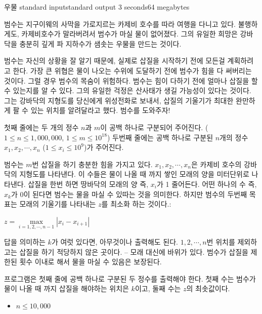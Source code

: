 \begin{problem}{우물}
	{standard input}{standard output}
	{3 seconds}{64 megabytes}{}
	
	
	범수는 지구이웨의 사막을 가로지르는 카제비 호수를 따라 여행을 다니고 있다. 불행하게도, 카제비호수가 말라버려서 범수가 마실 물이 없어졌다. 그의 유일한 희망은 강바닥을 충분히 깊게 파 지하수가 샘솟는 우물을 만드는 것이다.

	범수는 자신의 상황을 잘 알기 때문에, 실제로 삽질을 시작하기 전에 모든걸 계획하려고 한다. 가장 큰 위협은 물이 나오는 수위에 도달하기 전에 범수가 힘을 다 써버리는 것이다. 그럴 경우 범수의 목숨이 위험하다. 범수는 힘이 다하기 전에 얼마나 삽질을 할 수 있는지를 알 수 있다. 그의 유일한 걱정은 산사태가 생길 가능성이 있다는 것이다. 그는 강바닥의 지형도를 당신에게 위성전화로 보내서, 삽질의 기울기가 최대한 완만하게 팔 수 있는 위치를 알려달라고 했다. 범수를 도와주자!
 
	\InputFile
	
	 첫째 줄에는 두 개의 정수 $n$과 $m$이 공백 하나로 구분되어 주어진다. ($1 \le n \le 1,000,000$, $1 \le m \le 10^{18}$) 두번째 줄에는 공백 하나로 구분된 $n$개의 정수 $x_1 , x_2 , \cdots, x_n$ ($1 \le x_i \le 10^9$)가 주어진다.
	 
	 범수는 $m$번 삽질을 하기 충분한 힘을 가지고 있다. $x_1, x_2, \cdots, x_n$은 카제비 호수의 강바닥의 지형도를 나타낸다. 이 수들은 물이 나올 때 까지 쌓인 모래의 양을 미터단위로 나타낸다. 삽질을 한번 하면 땅바닥의 모래의 양 즉, $x_i$가 1 줄어든다. 어떤 하나의 수 즉, $x_k$가 0이 된다면 범수는 물을 마실 수 있따는 것을 의미한다. 하지만 범수의 두번째 목표는 모래의 기울기를 나타내는 $z$를 최소화 하는 것이다.:

\begin{center}
	\Large
	$z =  \underset{i=1, 2, \cdots, n-1}{\max} |x_i - x_{i+1}|$
\end{center}

	답을 의미하는 $k$가 여럿 있다면, 아무것이나 출력해도 된다. $1, 2, \cdots, n$번 위치를 제외하고는 삽질을 하기 적당하지 않은 곳이다. -- 모래 대신에 바위가 있다. 범수가 삽질을 제한된 횟수 이내로 해서 물을 마실 수 있음은 보장된다.

	\OutputFile
	
	프로그램은 첫째 줄에 공백 하나로 구분된 두 정수를 출력해야 한다. 첫째 수는 범수가 물이 나올 때 까지 삽질을 해야하는 위치은 $k$이고, 둘째 수는 $z$의 최솟값이다.
	
	
	\begin{itemize}
		\item $n \le 10,000$
	\end{itemize}
	

\end{problem}
